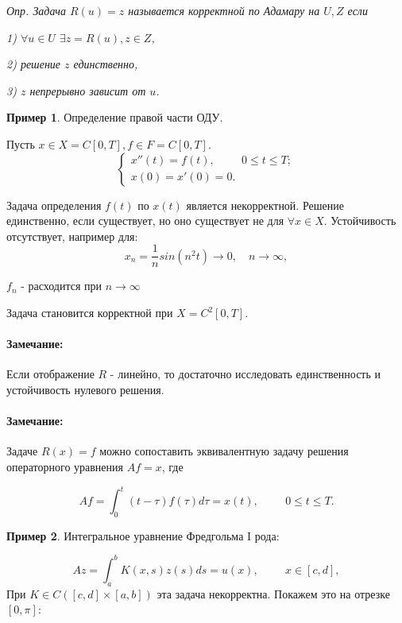 \documentclass{article}
\newenvironment{observation}{ \paragraph{Замечание:}}{}
\begin{document}
\smallskip

\textit{Опр. Задача $R(u) = z$ называется корректной по Адамару на $U,Z$ если}

\textit{1) $\forall u \in U$ $\exists z = R(u), z \in Z$,}

\textit{2) решение $z$ единственно,}

\textit{3) $z$ непрерывно зависит от $u$.}


\bigskip
\textbf{Пример 1}. Определение правой части ОДУ.

Пусть $x \in X = C[0,T], f \in F = C[0,T]$.
\begin{equation*}
\begin{cases}
	x''(t) = f(t), \hspace{1cm} 0 \leqslant t \leqslant T;\\
	x(0) = x'(0) = 0.
\end{cases}
\end{equation*}

Задача определения $f(t)$ по $x(t)$ является некорректной.
Решение единственно, если существует, но оно существует не для $\forall x \in X$.
Устойчивость отсутствует, например для:
$$
	x_n = \frac{1}{n} sin(n^2t) \rightarrow 0, \quad n \rightarrow \infty ,
$$

$f_n$ - расходится при $n \rightarrow \infty $

Задача становится корректной при $X = C^2[0,T]$.

\bigskip

\begin{observation}
	Если отображение $R$ - линейно, то достаточно исследовать единственность и устойчивость нулевого решения.
\end{observation}
\begin{observation}
	Задаче $R(x) = f$ можно сопоставить эквивалентную задачу решения операторного уравнения $Af = x$, где
\end{observation}

\begin{equation*}
	Af = \int_0^t (t - \tau) f(\tau) d \tau = x(t), \hspace{1cm} 0 \leqslant t \leqslant T.
\end{equation*}

\bigskip

\textbf{Пример 2}. Интегральное уравнение Фредгольма I рода:

\begin{equation*}
	Az = \int_a^b K(x,s) z(s) ds = u(x),  \hspace{1cm} x \in [c,d],
\end{equation*}
При $K \in C([c,d] \times [a,b])$ эта задача некорректна.
Покажем это на отрезке $[0,\pi]$:
\end{document}
